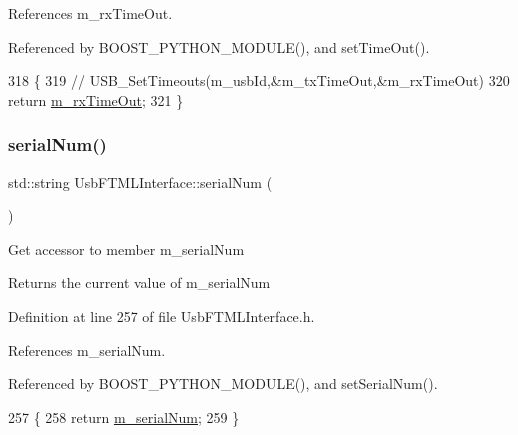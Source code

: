 References m\+\_\+rx\+Time\+Out.



Referenced by B\+O\+O\+S\+T\+\_\+\+P\+Y\+T\+H\+O\+N\+\_\+\+M\+O\+D\+U\+L\+E(), and set\+Time\+Out().


\begin{DoxyCode}
318                    \{
319     \textcolor{comment}{//    USB\_SetTimeouts(m\_usbId,&m\_txTimeOut,&m\_rxTimeOut)}
320     \textcolor{keywordflow}{return} \hyperlink{classUsbFTMLInterface_a4e3a413912cb5f61b5885c0d22e6c179}{m\_rxTimeOut};
321   \}
\end{DoxyCode}
\mbox{\label{classUsbFTMLInterface_a6b005503472f0ff0357662555275cba4}} 
\subsubsection{\texorpdfstring{serial\+Num()}{serialNum()}}
{\footnotesize\ttfamily std\+::string Usb\+F\+T\+M\+L\+Interface\+::serial\+Num (\begin{DoxyParamCaption}{ }\end{DoxyParamCaption})\hspace{0.3cm}{\ttfamily [inline]}}

Get accessor to member m\+\_\+serial\+Num \begin{DoxyReturn}{Returns}
the current value of m\+\_\+serial\+Num 
\end{DoxyReturn}


Definition at line 257 of file Usb\+F\+T\+M\+L\+Interface.\+h.



References m\+\_\+serial\+Num.



Referenced by B\+O\+O\+S\+T\+\_\+\+P\+Y\+T\+H\+O\+N\+\_\+\+M\+O\+D\+U\+L\+E(), and set\+Serial\+Num().


\begin{DoxyCode}
257                          \{
258     \textcolor{keywordflow}{return} \hyperlink{classUsbFTMLInterface_a389d847226de3203f7331ab8509c442c}{m\_serialNum};
259   \}
\end{DoxyCode}
\mbox{\label{classUsbFTMLInterface_a0223b6508fe1ac8da3aee952da113b1a}} 
